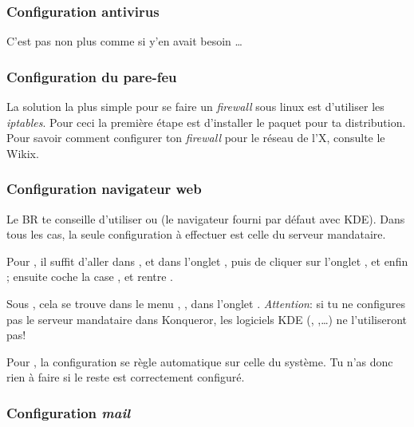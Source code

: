 \subsubsection{Configuration antivirus}

{C'est pas non plus comme si y'en avait besoin \dots}

\subsubsection{Configuration du pare-feu}

La solution la plus simple pour se faire un \emph{firewall} sous linux est d'utiliser les \emph{iptables}. Pour ceci la premi\`ere \'etape est
d'installer le paquet  pour ta distribution. Pour savoir comment configurer ton \emph{firewall} pour le r\'eseau de l'X, consulte le Wikix.

\subsubsection{Configuration navigateur web}

 Le BR te conseille d'utiliser  ou
 (le navigateur fourni par d\'efaut avec KDE). Dans tous les cas, la seule
configuration \`a  effectuer est celle du serveur mandataire.

Pour , il suffit d'aller dans ,  et dans l'onglet , puis de cliquer sur l'onglet
, et enfin  ; ensuite coche la case , et rentre 
.

Sous , cela se trouve dans le menu , ,
dans l'onglet . \emph{Attention}: si tu ne configures pas le serveur mandataire dans Konqueror,
les logiciels KDE (, ,\dots) ne l'utiliseront pas!

Pour , la configuration se règle automatique sur celle du système. Tu n'as donc rien à faire si le reste est correctement configuré.


\pagebreak

\subsubsection{Configuration \emph{mail}}

